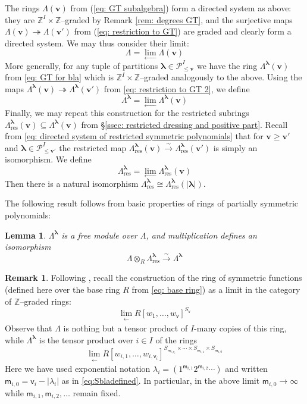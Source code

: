 \documentclass[11pt,reqno]{amsart}
\renewcommand{\mathbf}{\mathbold}
\numberwithin{equation}{section}
\newtheorem{Lemma}[equation]{Lemma}
\theoremstyle{definition}
\newtheorem{Remark}[equation]{Remark}
\newcommand{\cP}{\mathcal{P}}
\newcommand{\bv}{\mathbf{v}}
\newcommand{\ZZ}{\mathbb{Z}}
\renewcommand{\bv}{\mathbf{v}} %
\newcommand{\sv}{\mathsf{v}}
\newcommand{\sm}{\mathsf{m}}
\newcommand{\vertexset}{I}
\newcommand{\GT}{\Lambda}
\newcommand{\base}{R}
\newcommand{\Partitions}{\cP}
\newcommand{\la}{\lambda}
\newcommand{\bla}{{\boldsymbol{\lambda}}}
\newcommand{\res}{\mathrm{res}}
\begin{document}
The rings $\GT(\bv)$ from (\ref{eq: GT subalgebra}) form a  directed system as above:
they are $\ZZ^\vertexset\times \ZZ$--graded by Remark \ref{rem: degrees GT}, and the surjective maps $\GT(\bv) \twoheadrightarrow \GT(\bv')$ from (\ref{eq: restriction to GT}) are graded and clearly form a directed system. We may thus consider their limit:
\begin{equation}
    \label{eq: GT limit 1}
    \GT = \lim_{\longleftarrow} \GT(\bv)
\end{equation}
More generally, for any tuple of partitions  $\bla \in \Partitions_{\leq \bv}^\vertexset$ we have the ring $\GT^\bla(\bv)$ from \eqref{eq: GT for bla} which is $\ZZ^\vertexset\times \ZZ$--graded analogously to the above.  Using the maps $\GT^\bla(\bv) \twoheadrightarrow \GT^{\bla}(\bv')$ from \eqref{eq: restriction to GT 2}, we define
\begin{equation}
    \label{eq: GT limit 2}
    \GT^\bla = \lim_{\longleftarrow} \GT^\bla(\bv)
\end{equation}
Finally, we may repeat this construction for the restricted subrings $\GT^\bla_\res(\bv) \subseteq \GT^\bla(\bv)$ from \S \ref{ssec: restricted dressing and positive part}.  Recall from \eqref{eq: directed system of restricted symmetric polynomials} that for $\bv \geq \bv'$ and $\bla \in \Partitions_{\leq \bv'}^\vertexset$ the restricted map $\GT^\bla_\res(\bv) \xrightarrow{\sim} \GT_\res^\bla(\bv')$ is simply an isomorphism. We define
\begin{equation}
    \label{eq: GT limit 3}
    \GT^\bla_\res = \lim_{\longleftarrow} \GT_\res^\bla(\bv)
\end{equation}
Then there is a natural isomorphism $\GT^\bla_\res \cong \GT^\bla_\res(|\bla|)$.

The following result follows from basic properties of rings of partially symmetric polynomials:
\begin{Lemma}
    \label{lem: GT bla free}
    $\GT^\bla$ is a free module over $\GT$, and multiplication defines an isomorphism
    $$
    \GT \otimes_\base \GT^\bla_\res  \stackrel{\sim}{\longrightarrow} \GT^\bla
    $$
\end{Lemma}


\begin{Remark}
    Following \cite[\S I.2]{Macdonald}, recall the construction of the ring of symmetric functions (defined here over the base ring $\base$ from \eqref{eq: base ring}) as a limit in the category of $\ZZ$--graded rings:
    $$
    \lim_{\substack{\longleftarrow}} \base[w_1,\ldots,w_\sv]^{S_\sv}
    $$
    Observe that $\GT$ is nothing but a tensor product of $\vertexset$-many copies of this ring, while $\GT^\bla$ is the tensor product over $i \in \vertexset$ of the rings
    $$
    \lim_{\substack{\longleftarrow}} R[w_{i,1}, \ldots, w_{i, \sv_i}]^{S_{\sm_{i,\sv_i}} \times \cdots \times S_{\sm_{i,1}} \times S_{\sm_{i,0}}}
    $$
        Here we have used exponential notation $\la_i = (1^{\sm_{i,1}}2^{\sm_{i,2}}\cdots)$ and written $\sm_{i,0} = \sv_i - |\la_i|$ as in \eqref{eq:Sbladefined}. In particular, in the above limit  $\sm_{i,0} \rightarrow \infty$ while $\sm_{i,1}, \sm_{i,2},\ldots$ remain fixed.
\end{Remark}
\end{document}
